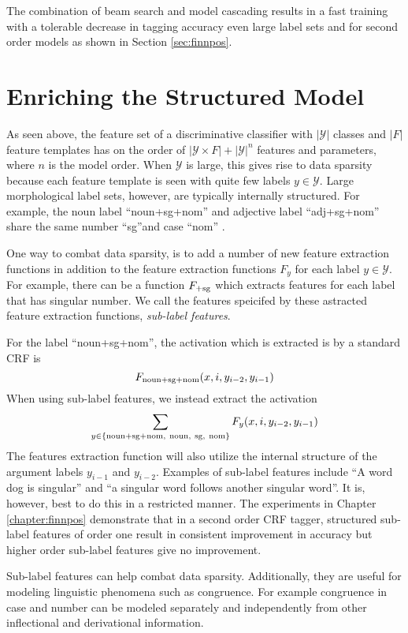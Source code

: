 The combination of beam search and model cascading results in a fast
training with a tolerable decrease in tagging accuracy even large
label sets and for second order models as shown in Section
\ref{sec:finnpos}.

\section{Enriching the Structured Model}\label{sec:sub-labels}
As seen above, the feature set of a discriminative classifier with
$|\mathcal{Y}|$ classes and $|F|$ feature templates has on the order
of $|\mathcal{Y}\times F| + |\mathcal{Y}|^n$ features and parameters,
where $n$ is the model order. When $\mathcal{Y}$ is large, this gives
rise to data sparsity because each feature template is seen with quite
few labels $y \in \mathcal{Y}$. Large morphological label sets,
however, are typically internally structured. For example, the noun
label ``noun+sg+nom'' and adjective label ``adj+sg+nom'' share the
same number ``sg''and case ``nom'' .

One way to combat data sparsity, is to add a number of new feature
extraction functions in addition to the feature extraction functions
$F_y$ for each label $y\in \mathcal{Y}$. For example, there can be a
function $F_{{\rm +sg}}$ which extracts features for each label that
has singular number. We call the features speicifed by these astracted
feature extraction functions, {\it sub-label features}.

For the label ``noun+sg+nom'', the activation which is extracted is by a standard CRF is
$$F_{\rm noun+sg+nom}(x, i, y_{i-2}, y_{i-1})$$
When using sub-label features, we instead extract the activation
$$\sum_{y \in \{{\rm noun+sg+nom,\ noun,\ sg,\ nom\}}} F_{y}(x, i, y_{i-2}, y_{i-1})$$
The features extraction function will also utilize the internal
structure of the argument labels $y_{i-1}$ and $y_{i-2}$. Examples of
sub-label features include ``A word dog is singular'' and ``a singular
word follows another singular word''. It is, however, best to do this
in a restricted manner. The experiments in Chapter
\ref{chapter:finnpos} demonstrate that in a second order CRF tagger,
structured sub-label features of order one result in consistent
improvement in accuracy but higher order sub-label features give no
improvement.

Sub-label features can help combat data sparsity. Additionally, they
are useful for modeling linguistic phenomena such as congruence. For
example congruence in case and number can be modeled separately and
independently from other inflectional and derivational information.

